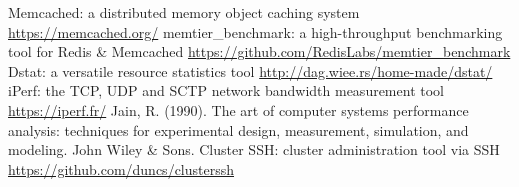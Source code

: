 \documentclass[11pt,a4paper]{article}
\begin{document}
\begin{thebibliography}{9}
 Memcached: a distributed memory object caching system \url{https://memcached.org/}
 memtier\_benchmark: a high-throughput benchmarking tool for Redis \& Memcached \url{https://github.com/RedisLabs/memtier\_benchmark}
 Dstat: a versatile resource statistics tool \url{http://dag.wiee.rs/home-made/dstat/}
 iPerf: the TCP, UDP and SCTP network bandwidth measurement tool \url{https://iperf.fr/}
 Jain, R. (1990). The art of computer systems performance analysis: techniques for experimental design, measurement, simulation, and modeling. John Wiley \& Sons.
 Cluster SSH: cluster administration tool via SSH \url{https://github.com/duncs/clusterssh}
\end{thebibliography}
\end{document}
